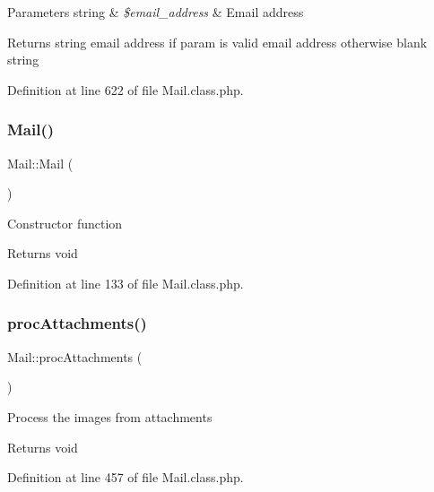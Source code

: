\begin{DoxyParams}[1]{Parameters}
string & {\em \$email\+\_\+address} & Email address \\
\hline
\end{DoxyParams}
\begin{DoxyReturn}{Returns}
string email address if param is valid email address otherwise blank string 
\end{DoxyReturn}


Definition at line 622 of file Mail.\+class.\+php.

\mbox{\label{classMail_acd3d916cd6a769cdaf6e91dbc2c85699}} 
\subsubsection{\texorpdfstring{Mail()}{Mail()}}
{\footnotesize\ttfamily Mail\+::\+Mail (\begin{DoxyParamCaption}{ }\end{DoxyParamCaption})}

Constructor function

\begin{DoxyReturn}{Returns}
void 
\end{DoxyReturn}


Definition at line 133 of file Mail.\+class.\+php.

\mbox{\label{classMail_a136e94d3b4ae6cea8944cf05f58754ce}} 
\subsubsection{\texorpdfstring{proc\+Attachments()}{procAttachments()}}
{\footnotesize\ttfamily Mail\+::proc\+Attachments (\begin{DoxyParamCaption}{ }\end{DoxyParamCaption})}

Process the images from attachments

\begin{DoxyReturn}{Returns}
void 
\end{DoxyReturn}


Definition at line 457 of file Mail.\+class.\+php.

\mbox{\label{classMail_a185f66ac96139a53251ede273a120d13}} 

